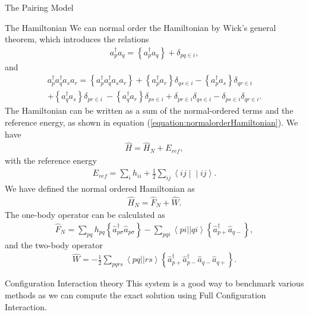 \documentclass[twoside,english]{uiofysmaster}
\begin{document}
\begin{chapter}{The Pairing Model}
\begin{section}{The Hamiltonian}
		We can normal order the Hamiltonian by Wick's general theorem, which introduces the relations
		\begin{align}
			a_p^{\dagger} a_q = \left\{ a_p^{\dagger}a_q \right\} + \delta_{pq \in i},
		\end{align}
		and
		\begin{align}
			a_p^{\dagger} a_q^{\dagger} a_s a_r = \left\{ a_p^{\dagger}a_q^{\dagger} a_s a_r \right\} +\left\{a_p^{\dagger}a_r\right\} \delta_{qs\in i} - \left\{a_p^{\dagger}a_s\right\} \delta_{qr\in i} \\
			+\left\{a_q^{\dagger}a_s\right\} \delta_{pr\in i} \
			- \left\{a_q^{\dagger}a_r\right\} \delta_{ps\in i} + \delta_{pr \in i} \delta_{qs \in i} - \delta_{ps \in i}\delta_{qr \in i}. \nonumber
		\end{align}
		The Hamiltonian can be written as a sum of the normal-ordered terms and the reference energy, as shown in equation (\ref{equation:normalorderHamiltonian}). We have 
		\begin{align*}
			\hat H = \hat H_N + E_{ref},
		\end{align*}
		with the reference energy
		\begin{align}
 			E_{ref} = \sum_{i} h_{ii} + \frac{1}{2} \sum_{ij} \left< ij \middle| \middle| ij \right>.
		\end{align}
		We have defined the normal ordered Hamiltonian as
		\begin{align}
			\hat H_N = \hat F_N + \hat W .
		\end{align}
		The one-body operator can be calculated as
		\begin{align}
			\hat F_N =  \sum_{pq} h_{pq} \left\{ \hat a_{p \sigma}^{\dagger} \hat a_{p \sigma} \right\}
			- \sum_{pqi} \left< pi || qi \right> \left\{ \hat a_{p +}^{\dagger} \hat a_{q -} \right\},
		\end{align}
		and the two-body operator 
		\begin{align}
			\hat W = - \frac{1}{2} \sum_{pqrs} \left< pq || rs \right> \left\{ \hat a_{p +}^{\dagger} \hat a_{p-}^{\dagger} \hat a_{q-} \hat a_{q+} \right\}.
		\end{align}
		

	\end{section}

	\newpage

	\begin{section}{Configuration Interaction theory}
		This system is a good way to benchmark various methods as we can compute the exact solution using Full Configuration Interaction. 


\end{section}
\end{chapter}
\end{document}
